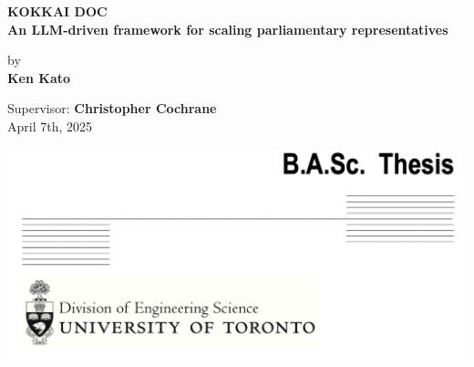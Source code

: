 \begin{titlepage}
    \thispagestyle{empty} %
    \begin{center}
        \Large
        \textbf{KOKKAI DOC}\\
        \textbf{An LLM-driven framework for scaling parliamentary representatives}

        \vspace{1.5cm}

        by\\
        \textbf{Ken Kato}

        \vspace{1.5cm}

        Supervisor: \textbf{Christopher Cochrane}\\
        April 7th, 2025

        \vfill %

        \includegraphics[width=\textwidth]{figs/front.png}%

    \end{center}
\end{titlepage}
